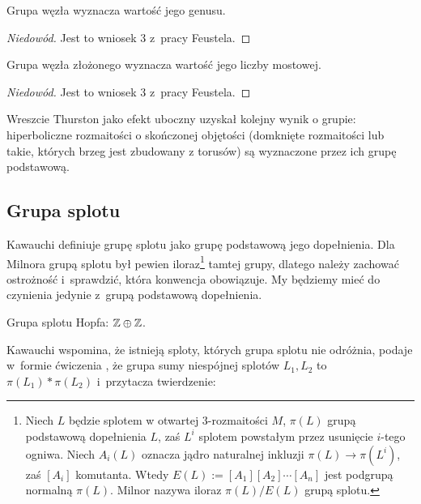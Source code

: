 \begin{proposition}
    Grupa węzła wyznacza wartość jego genusu.
\end{proposition}
\begin{proof}[Niedowód]
    Jest to wniosek 3 z~pracy \cite{feustel78} Feustela.
\end{proof}
\begin{proposition}
    Grupa węzła złożonego wyznacza wartość jego liczby mostowej.
\end{proposition}
\begin{proof}[Niedowód]
    Jest to wniosek 3 z~pracy \cite{feustel78} Feustela.
\end{proof}

Wreszcie Thurston \cite{thurston82} jako efekt uboczny uzyskał kolejny wynik o grupie: hiperboliczne rozmaitości o skończonej objętości (domknięte rozmaitości lub takie, których brzeg jest zbudowany z torusów) są wyznaczone przez ich grupę podstawową.
%

\subsection{Grupa splotu}

Kawauchi \cite[s. 73]{kawauchi96} definiuje grupę splotu jako grupę podstawową jego dopełnienia.
Dla Milnora \cite{milnor54} grupą splotu był pewien iloraz\footnote{%
Niech $L$ będzie splotem w otwartej 3-rozmaitości $M$, $\pi(L)$ grupą podstawową dopełnienia $L$, zaś $L^i$ splotem powstałym przez usunięcie $i$-tego ogniwa.
Niech $A_i(L)$ oznacza jądro naturalnej inkluzji $\pi(L) \to \pi(L^i)$, zaś $[A_i]$ komutanta.
Wtedy $E(L) := [A_1][A_2] \cdots [A_n]$ jest podgrupą normalną $\pi(L)$.
Milnor nazywa iloraz $\pi(L) / E(L)$ grupą splotu.%
} tamtej grupy, dlatego należy zachować ostrożność i~sprawdzić, która konwencja obowiązuje.
My będziemy mieć do czynienia jedynie z~grupą podstawową dopełnienia.

\begin{example}
    Grupa splotu Hopfa: $\mathbb Z \oplus \mathbb Z$.
\end{example}

Kawauchi wspomina, że istnieją sploty, których grupa splotu nie odróżnia, podaje w~formie ćwiczenia \cite[s. 73]{kawauchi96}, że grupa sumy niespójnej splotów $L_1, L_2$ to $\pi(L_1) * \pi(L_2)$ i~przytacza twierdzenie:

